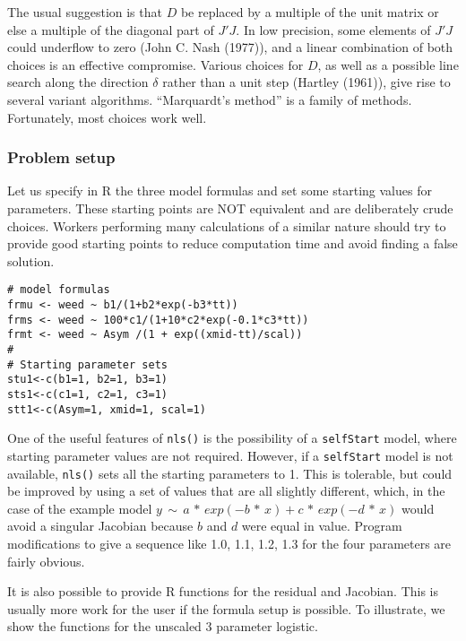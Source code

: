 The usual suggestion is that \(D\) be replaced by a multiple of the unit matrix or else
a multiple of the diagonal part of \(J' J\). In low precision, some elements of
\(J' J\) could underflow to zero (John C. Nash (1977)), and a linear combination of both
choices is an effective compromise. Various choices for
\(D\), as well as a possible line search along the
direction \(\delta\) rather than a unit step (Hartley (1961)),
give rise to several variant
algorithms. ``Marquardt's method'' is a family of methods. Fortunately, most choices
work well.

\hypertarget{problem-setup}{%
\subsubsection{Problem setup}\label{problem-setup}}

Let us specify in R the three model formulas and set some starting
values for parameters. These starting points are NOT equivalent and
are deliberately crude choices. Workers performing many calculations
of a similar nature should try to provide good starting points to reduce
computation time and avoid finding a false solution.

\begin{verbatim}
# model formulas
frmu <- weed ~ b1/(1+b2*exp(-b3*tt))
frms <- weed ~ 100*c1/(1+10*c2*exp(-0.1*c3*tt))
frmt <- weed ~ Asym /(1 + exp((xmid-tt)/scal))
#
# Starting parameter sets
stu1<-c(b1=1, b2=1, b3=1)
sts1<-c(c1=1, c2=1, c3=1)
stt1<-c(Asym=1, xmid=1, scal=1)
\end{verbatim}

One of the useful features of \texttt{nls()} is the possibility of a \texttt{selfStart} model,
where starting parameter values are not required. However, if a \texttt{selfStart} model
is not available, \texttt{nls()} sets all the starting parameters
to 1. This is tolerable, but could be improved by using a set of values
that are all slightly different, which, in the case of the example
model \(y \,\sim\, a \,*\, exp(-b \,*\, x) + c\,*\,exp(-d \,*\, x)\)
would avoid a singular Jacobian because \(b\) and \(d\) were equal in value.
Program modifications to give a sequence like 1.0, 1.1, 1.2, 1.3 for the four
parameters are fairly obvious.

It is also possible to provide R functions for the residual and Jacobian.
This is usually more work for the user if the formula setup is possible.
To illustrate, we show the functions for the unscaled 3 parameter logistic.


